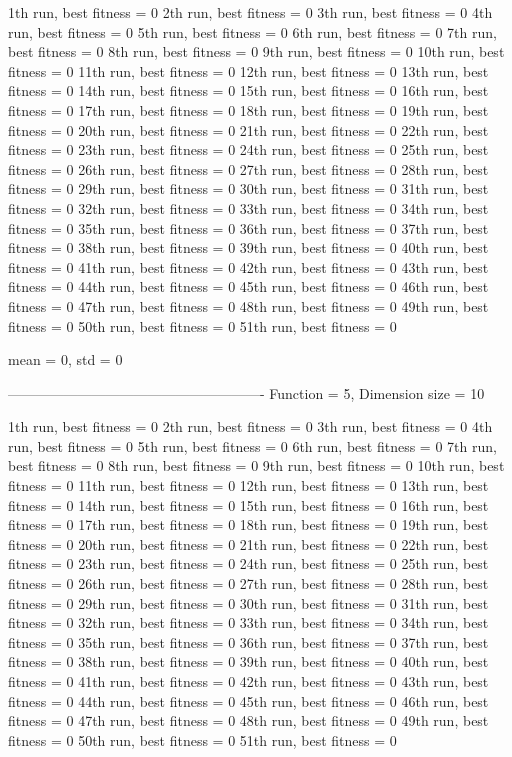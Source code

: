 1th run, best fitness = 0
2th run, best fitness = 0
3th run, best fitness = 0
4th run, best fitness = 0
5th run, best fitness = 0
6th run, best fitness = 0
7th run, best fitness = 0
8th run, best fitness = 0
9th run, best fitness = 0
10th run, best fitness = 0
11th run, best fitness = 0
12th run, best fitness = 0
13th run, best fitness = 0
14th run, best fitness = 0
15th run, best fitness = 0
16th run, best fitness = 0
17th run, best fitness = 0
18th run, best fitness = 0
19th run, best fitness = 0
20th run, best fitness = 0
21th run, best fitness = 0
22th run, best fitness = 0
23th run, best fitness = 0
24th run, best fitness = 0
25th run, best fitness = 0
26th run, best fitness = 0
27th run, best fitness = 0
28th run, best fitness = 0
29th run, best fitness = 0
30th run, best fitness = 0
31th run, best fitness = 0
32th run, best fitness = 0
33th run, best fitness = 0
34th run, best fitness = 0
35th run, best fitness = 0
36th run, best fitness = 0
37th run, best fitness = 0
38th run, best fitness = 0
39th run, best fitness = 0
40th run, best fitness = 0
41th run, best fitness = 0
42th run, best fitness = 0
43th run, best fitness = 0
44th run, best fitness = 0
45th run, best fitness = 0
46th run, best fitness = 0
47th run, best fitness = 0
48th run, best fitness = 0
49th run, best fitness = 0
50th run, best fitness = 0
51th run, best fitness = 0

mean = 0, std = 0

-------------------------------------------------------
Function = 5, Dimension size = 10

1th run, best fitness = 0
2th run, best fitness = 0
3th run, best fitness = 0
4th run, best fitness = 0
5th run, best fitness = 0
6th run, best fitness = 0
7th run, best fitness = 0
8th run, best fitness = 0
9th run, best fitness = 0
10th run, best fitness = 0
11th run, best fitness = 0
12th run, best fitness = 0
13th run, best fitness = 0
14th run, best fitness = 0
15th run, best fitness = 0
16th run, best fitness = 0
17th run, best fitness = 0
18th run, best fitness = 0
19th run, best fitness = 0
20th run, best fitness = 0
21th run, best fitness = 0
22th run, best fitness = 0
23th run, best fitness = 0
24th run, best fitness = 0
25th run, best fitness = 0
26th run, best fitness = 0
27th run, best fitness = 0
28th run, best fitness = 0
29th run, best fitness = 0
30th run, best fitness = 0
31th run, best fitness = 0
32th run, best fitness = 0
33th run, best fitness = 0
34th run, best fitness = 0
35th run, best fitness = 0
36th run, best fitness = 0
37th run, best fitness = 0
38th run, best fitness = 0
39th run, best fitness = 0
40th run, best fitness = 0
41th run, best fitness = 0
42th run, best fitness = 0
43th run, best fitness = 0
44th run, best fitness = 0
45th run, best fitness = 0
46th run, best fitness = 0
47th run, best fitness = 0
48th run, best fitness = 0
49th run, best fitness = 0
50th run, best fitness = 0
51th run, best fitness = 0

